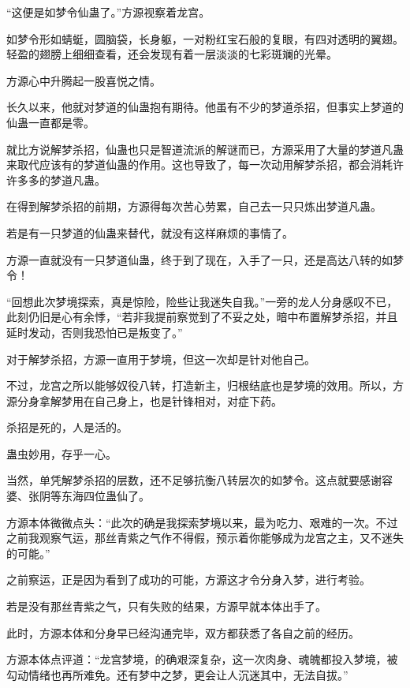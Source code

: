 
\begin{this_body}

“这便是如梦令仙蛊了。”方源视察着龙宫。

如梦令形如蜻蜓，圆脑袋，长身躯，一对粉红宝石般的复眼，有四对透明的翼翅。轻盈的翅膀上细细查看，还会发现有着一层淡淡的七彩斑斓的光晕。

方源心中升腾起一股喜悦之情。

长久以来，他就对梦道的仙蛊抱有期待。他虽有不少的梦道杀招，但事实上梦道的仙蛊一直都是零。

就比方说解梦杀招，仙蛊也只是智道流派的解谜而已，方源采用了大量的梦道凡蛊来取代应该有的梦道仙蛊的作用。这也导致了，每一次动用解梦杀招，都会消耗许许多多的梦道凡蛊。

在得到解梦杀招的前期，方源得每次苦心劳累，自己去一只只炼出梦道凡蛊。

若是有一只梦道的仙蛊来替代，就没有这样麻烦的事情了。

方源一直就没有一只梦道仙蛊，终于到了现在，入手了一只，还是高达八转的如梦令！

“回想此次梦境探索，真是惊险，险些让我迷失自我。”一旁的龙人分身感叹不已，此刻仍旧是心有余悸，“若非我提前察觉到了不妥之处，暗中布置解梦杀招，并且延时发动，否则我恐怕已是叛变了。”

对于解梦杀招，方源一直用于梦境，但这一次却是针对他自己。

不过，龙宫之所以能够奴役八转，打造新主，归根结底也是梦境的效用。所以，方源分身拿解梦用在自己身上，也是针锋相对，对症下药。

杀招是死的，人是活的。

蛊虫妙用，存乎一心。

当然，单凭解梦杀招的层数，还不足够抗衡八转层次的如梦令。这点就要感谢容婆、张阴等东海四位蛊仙了。

方源本体微微点头：“此次的确是我探索梦境以来，最为吃力、艰难的一次。不过之前我观察气运，那丝青紫之气作不得假，预示着你能够成为龙宫之主，又不迷失的可能。”

之前察运，正是因为看到了成功的可能，方源这才令分身入梦，进行考验。

若是没有那丝青紫之气，只有失败的结果，方源早就本体出手了。

此时，方源本体和分身早已经沟通完毕，双方都获悉了各自之前的经历。

方源本体点评道：“龙宫梦境，的确艰深复杂，这一次肉身、魂魄都投入梦境，被勾动情绪也再所难免。还有梦中之梦，更会让人沉迷其中，无法自拔。”


\end{this_body}
